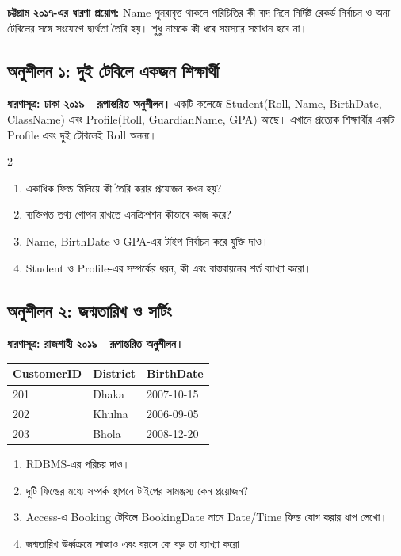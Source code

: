 \textbf{চট্টগ্রাম ২০১৭-এর ধারণা প্রয়োগ:} Name পুনরাবৃত্ত থাকলে পরিচিতির কী বাদ দিলে নির্দিষ্ট রেকর্ড নির্বাচন ও অন্য টেবিলের সঙ্গে সংযোগে দ্ব্যর্থতা তৈরি হয়। শুধু নামকে কী ধরে সমস্যার সমাধান হবে না।

\subsection{অনুশীলন ১: দুই টেবিলে একজন শিক্ষার্থী}
\textbf{ধারণাসূত্র: ঢাকা ২০১৯—রূপান্তরিত অনুশীলন।}
একটি কলেজে Student(Roll, Name, BirthDate, ClassName) এবং Profile(Roll, GuardianName, GPA) আছে। এখানে প্রত্যেক শিক্ষার্থীর একটি Profile এবং দুই টেবিলেই Roll অনন্য।
\begin{multicols}{2}
\small
\begin{enumerate}
\item[ক.] একাধিক ফিল্ড মিলিয়ে কী তৈরি করার প্রয়োজন কখন হয়?
\item[খ.] ব্যক্তিগত তথ্য গোপন রাখতে এনক্রিপশন কীভাবে কাজ করে?
\item[গ.] Name, BirthDate ও GPA-এর টাইপ নির্বাচন করে যুক্তি দাও।
\item[ঘ.] Student ও Profile-এর সম্পর্কের ধরন, কী এবং বাস্তবায়নের শর্ত ব্যাখ্যা করো।
\end{enumerate}
\small

\end{multicols}


\subsection{অনুশীলন ২: জন্মতারিখ ও সর্টিং}
\textbf{ধারণাসূত্র: রাজশাহী ২০১৯—রূপান্তরিত অনুশীলন।}
\begin{flushleft}
\small
\begin{tabular}{|l|l|l|}\hline
CustomerID & District & BirthDate\\ \hline
201 & Dhaka & 2007-10-15\\\hline
202 & Khulna & 2006-09-05\\\hline
203 & Bhola & 2008-12-20\\ \hline
\end{tabular}
\end{flushleft}
\begin{enumerate}
\item[ক.] RDBMS-এর পরিচয় দাও।
\item[খ.] দুটি ফিল্ডের মধ্যে সম্পর্ক স্থাপনে টাইপের সামঞ্জস্য কেন প্রয়োজন?
\item[গ.] Access-এ Booking টেবিলে BookingDate নামে Date/Time ফিল্ড যোগ করার ধাপ লেখো।
\item[ঘ.] জন্মতারিখ ঊর্ধ্বক্রমে সাজাও এবং বয়সে কে বড় তা ব্যাখ্যা করো।
\end{enumerate}

